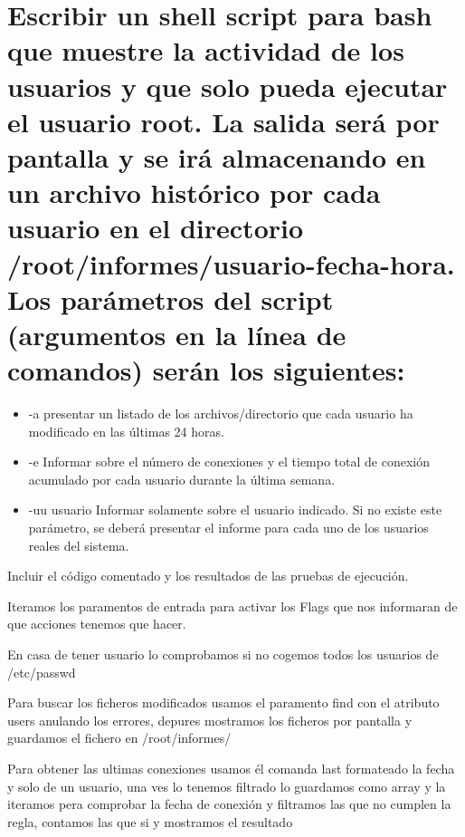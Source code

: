 \documentclass[preprint,11pt]{elsarticle}
\begin{document}
\clearpage
\section{Escribir un shell script para bash que muestre la actividad de los usuarios y que solo pueda ejecutar el usuario root. La salida será por pantalla y se irá almacenando en un archivo histórico por cada usuario en el directorio /root/informes/usuario-fecha-hora. Los parámetros del script (argumentos en la línea de comandos) serán los siguientes:}

\begin{itemize}
    \item-a presentar un listado de los archivos/directorio que cada usuario ha modificado en las últimas 24 horas.
    \item-e Informar sobre el número de conexiones y el tiempo total de conexión acumulado por cada usuario durante la última semana.
    \item-uu usuario Informar solamente sobre el usuario indicado. Si no existe este parámetro, se deberá presentar el informe para cada uno de los usuarios reales del sistema.
\end{itemize}

Incluir el código comentado y los resultados de las pruebas de ejecución.\bigskip


Iteramos los paramentos de entrada para activar los Flags que nos informaran de que acciones tenemos que hacer.



En casa de tener usuario lo comprobamos si no cogemos todos los usuarios de /etc/passwd



\clearpage
Para buscar los ficheros modificados usamos el paramento find con el atributo users anulando los errores, depures mostramos los ficheros por pantalla y guardamos el fichero en /root/informes/



Para obtener las ultimas conexiones usamos él comanda last formateado la fecha y solo de un usuario, una ves lo tenemos filtrado lo guardamos como array y la iteramos pera comprobar la fecha de conexión y filtramos las que no cumplen la regla, contamos las que si y mostramos el resultado

\end{document}
